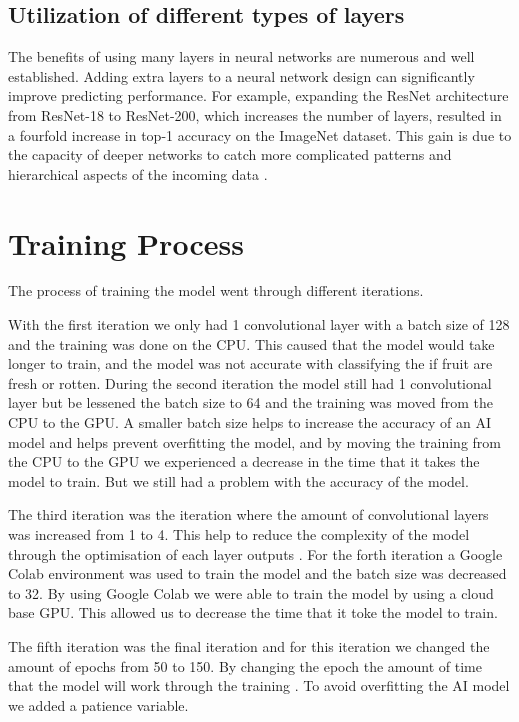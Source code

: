 \documentclass[conference]{IEEEtran}
\begin{document}
\subsection{Utilization of different types of layers}
The benefits of using many layers in  neural networks are numerous and well established. Adding extra layers to a neural network design can significantly improve predicting performance. For example, expanding the ResNet architecture from ResNet-18 to ResNet-200, which increases the number of layers, resulted in a fourfold increase in top-1 accuracy on the ImageNet dataset. This gain is due to the capacity of deeper networks to catch more complicated patterns and hierarchical aspects of the incoming data \cite{b9}.

\section{Training Process}

The process of training the model went through different iterations.

With the first iteration we only had 1 convolutional layer with a batch size of 128 and the training was done on the CPU. This caused that the model would take longer to train, and the model was not accurate with classifying the if fruit are fresh or rotten. During the second iteration the model still had 1 convolutional layer but be lessened the batch size to 64 and the training was moved from the CPU to the GPU. A smaller batch size helps to increase the accuracy of an AI model \cite{b2} and helps prevent overfitting the model, and by moving the training from the CPU to the GPU we experienced a decrease in the time that it takes the model to train. But we still had a problem with the accuracy of the model.

The third iteration was the iteration where the amount of convolutional layers was increased from 1 to 4. This help to reduce the complexity of the model through the optimisation of each layer outputs \cite{b3}. For the forth iteration a Google Colab environment was used to train the model and the batch size was decreased to 32. By using Google Colab we were able to train the model by using a cloud base GPU. This allowed us to decrease the time that it toke the model to train.

The fifth iteration was the final iteration and for this iteration we changed the amount of epochs from 50 to 150. By changing the epoch the amount of time that the model will work through the training \cite{b4}. To avoid overfitting the AI model we added a patience variable.
\end{document}
